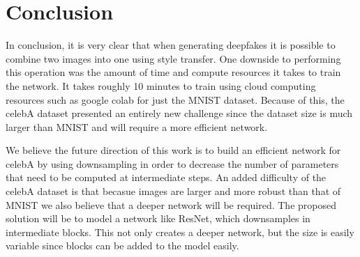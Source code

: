 \documentclass{article}
\begin{document}
\section{Conclusion}

In conclusion, it is very clear that when generating deepfakes it is possible to combine two images into one using style transfer. One downside to
performing this operation was the amount of time and compute resources it takes to train the network. It takes roughly 10 minutes to train using cloud
computing resources such as google colab for just the MNIST dataset. Because of this, the celebA dataset presented an entirely new challenge since the
dataset size is much larger than MNIST and will require a more efficient network.

We believe the future direction of this work is to build an efficient network for celebA by using downsampling in order to decrease the number of parameters
that need to be computed at intermediate steps. An added difficulty of the celebA dataset is that becasue images are larger and more robust than that of MNIST
we also believe that a deeper network will be required. The proposed solution will be to model a network like ResNet, which downsamples in intermediate blocks.
This not only creates a deeper network, but the size is easily variable since blocks can be added to the model easily.

\pagebreak



\end{document}

